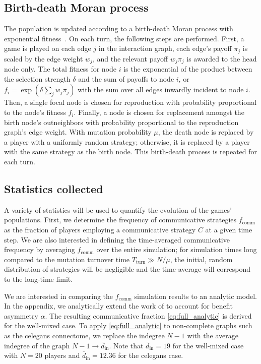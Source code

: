 \documentclass[pdflatex,lineno,referee,sn-mathphys-ay]{sn-jnl}
\begin{document}
\subsection{Birth-death Moran process}
\label{sec:evo_setup}
The population is updated according to a birth-death Moran process
with exponential fitness~\citep[\eg \cf][]{lieberman2005evolutionary}.
On each turn, the following steps are performed.
First, a game is played on each edge $j$ in the interaction graph,
each edge's payoff $\pi_j$ is scaled by the edge weight $w_j$,
and the relevant payoff $w_j \pi_j$ is awarded to the head node only.
The total fitness for node $i$ is the exponential of the product
between the selection strength $\delta$
and the sum of payoffs to node $i$,
or $f_i = \exp(\delta \sum_j w_j \pi_j)$ with the sum
over all edges inwardly incident to node $i$.
Then, a single focal node is chosen for reproduction
with probability proportional to the node's fitness $f_i$.
Finally, a node is chosen for replacement amongst the birth node's outneighbors
with probability proportional to the reproduction graph's edge weight.
With mutation probability $\mu$,
the death node is replaced by a player with a uniformly random strategy;
otherwise, it is replaced by a player with the same strategy as the birth node.
This birth-death process is repeated for each turn.

\subsection{Statistics collected}
\label{sec:stats_setup}
A variety of statistics will be used to quantify the evolution
of the games' populations.
First, we determine the frequency of communicative strategies
$f_{\text{comm}}$ as the fraction of players employing
a communicative strategy $C$ at a given time step.
We are also interested in defining the time-averaged communicative frequency
by averaging $f_{\text{comm}}$ over the entire simulation;
for simulation times long compared to the mutation turnover time
$T_{\text{turn}} \gg N/\mu$,
the initial, random distribution of strategies will be negligible
and the time-average will correspond to the long-time limit.

We are interested in comparing the $f_{\text{comm}}$ simulation results
to an analytic model.
In the appendix, we analytically extend the work of \citet{tripp2022evolutionary}
to account for benefit asymmetry $\alpha$.
The resulting communicative fraction \cref{eq:full_analytic}
is derived for the well-mixed case.
To apply \cref{eq:full_analytic} to non-complete graphs such as
the \gls{celegans} connectome,
we replace the indegree $N-1$ with the average indegree of the graph
$N-1 \to \overline{d}_{\text{in}}$.
Note that $\overline{d}_{\text{in}} = \num{19}$
for the well-mixed case with $N=20$ players
and $\overline{d}_{\text{in}} = \num{12.36}$ for the \gls{celegans} case.
\end{document}
